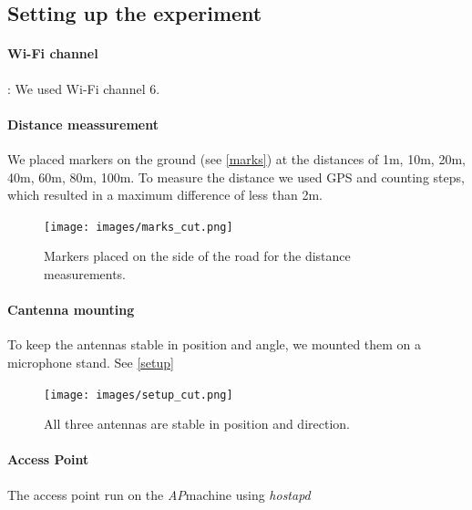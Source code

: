 \documentclass[12pt,a4paper]{article}
\newcommand{\ap}[0]{\emph{AP}}
\begin{document}
	\subsection{Setting up the experiment}
		\paragraph{Wi-Fi channel}: We used Wi-Fi channel $6$.
		\paragraph{Distance meassurement} We placed markers on the ground (see \autoref{marks}) at the distances of 1m, 10m, 20m, 40m, 60m, 80m, 100m. To measure the distance we used GPS and counting steps, which resulted in a maximum difference of less than 2m.
		\begin{figure}
			\texttt{[image: images/marks\_cut.png]}
			\caption{Markers placed on the side of the road for the distance measurements.}
			\label{marks}
		\end{figure}
		\paragraph{Cantenna mounting} To keep the antennas stable in position and angle, we mounted them on a microphone stand. See \autoref{setup}
		\begin{figure}
			\begin{centering}
				\texttt{[image: images/setup\_cut.png]}
				\caption{All three antennas are stable in position and direction.}
				\label{setup}
			\end{centering}
		\end{figure}
		\paragraph{Access Point} The access point run on the \ap machine using \emph{hostapd}
	
\end{document}
